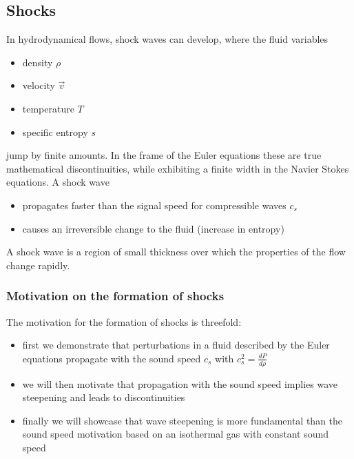 \subsection{Shocks}
In hydrodynamical flows, shock waves can develop, where the fluid variables
\begin{itemize}
    \item density $\rho$
    \item velocity $\vec{v}$
    \item temperature $T$
    \item specific entropy $s$
\end{itemize}
jump by finite amounts. In the frame of the Euler equations these are
true mathematical discontinuities, while exhibiting a finite width in the Navier Stokes equations. A shock wave
\begin{itemize}
    \item propagates faster than the signal speed for compressible waves $c_s$
    \item causes an irreversible change to the fluid (increase in entropy)
\end{itemize}
A shock wave is a region of small thickness over which the properties of the flow change rapidly.

\subsubsection{Motivation on the formation of shocks}

The motivation for the formation of shocks is threefold:

\begin{itemize}
    \item first we demonstrate that perturbations in a fluid described by the Euler equations
    propagate with the sound speed $c_s$ with $c_s^2 = \frac{dP}{d\rho}$
    \item we will then motivate that propagation with the sound speed implies wave steepening
    and leads to discontinuities
    \item finally we will showcase that wave steepening is more fundamental than the sound speed motivation
    based on an isothermal gas with constant sound speed
\end{itemize}

\label{sec:sound_speed}


